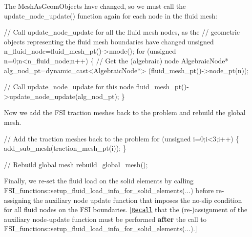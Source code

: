 The {\ttfamily Mesh\+As\+Geom\+Objects} have changed, so we must call the {\ttfamily update\+\_\+node\+\_\+update()} function again for each node in the fluid mesh\+:


\begin{DoxyCodeInclude}

 \textcolor{comment}{// Call update\_node\_update for all the fluid mesh nodes, as the}
 \textcolor{comment}{// geometric objects representing the fluid mesh boundaries have changed}
 \textcolor{keywordtype}{unsigned} n\_fluid\_node=fluid\_mesh\_pt()->nnode();
 \textcolor{keywordflow}{for} (\textcolor{keywordtype}{unsigned} n=0;n<n\_fluid\_node;n++)
  \{
   \textcolor{comment}{// Get the (algebraic) node}
   AlgebraicNode* alg\_nod\_pt=\textcolor{keyword}{dynamic\_cast<}AlgebraicNode*\textcolor{keyword}{>}
    (fluid\_mesh\_pt()->node\_pt(n));

   \textcolor{comment}{// Call update\_node\_update for this node}
   fluid\_mesh\_pt()->update\_node\_update(alg\_nod\_pt);
  \}

\end{DoxyCodeInclude}


Now we add the F\+SI traction meshes back to the problem and rebuild the global mesh.


\begin{DoxyCodeInclude}

 \textcolor{comment}{// Add the traction meshes back to the problem}
 \textcolor{keywordflow}{for} (\textcolor{keywordtype}{unsigned} i=0;i<3;i++)
  \{
   add\_sub\_mesh(traction\_mesh\_pt(i));
  \}

 \textcolor{comment}{// Rebuild global mesh}
 rebuild\_global\_mesh();

\end{DoxyCodeInclude}


Finally, we re-\/set the fluid load on the solid elements by calling {\ttfamily F\+S\+I\+\_\+functions\+::setup\+\_\+fluid\+\_\+load\+\_\+info\+\_\+for\+\_\+solid\+\_\+elements}(...) before re-\/assigning the auxiliary node update function that imposes the no-\/slip condition for all fluid nodes on the F\+SI boundaries. \mbox{[}\href{../../fsi_channel_with_leaflet/html/index.html#action_after_adapt}{\tt Recall} that the (re-\/)assignment of the auxiliary node-\/update function must be performed {\bfseries after} the call to {\ttfamily F\+S\+I\+\_\+functions\+::setup\+\_\+fluid\+\_\+load\+\_\+info\+\_\+for\+\_\+solid\+\_\+elements}(...).\mbox{]}


